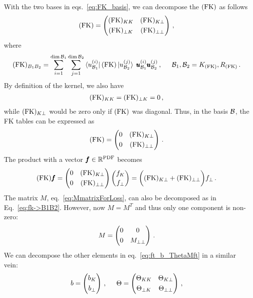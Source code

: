 With the two bases in eqs.~\eqref{eq:FK_basis}, we can decompose the $(\mathrm{FK})$ as follows
\begin{equation}
  (\mathrm{FK}) =
  \begin{pmatrix}
    (\mathrm{FK})_{KK}     & (\mathrm{FK})_{K\bot} \\[3pt]
    (\mathrm{FK})_{\bot K} & (\mathrm{FK})_{\bot\bot}
  \end{pmatrix} \,,
\end{equation}
where
\begin{align}
  (\mathrm{FK})_{B_1 B_2} = \sum_{i=1}^{\dim\mathcal{B}_1} \sum_{j=1}^{\dim\mathcal{B}_2}
  \bra{u_{\mathcal{B}_1}^{(i)}} (\mathrm{FK}) \ket{u_{\mathcal{B}_2}^{(j)}} \;
  \pmb{u}_{\mathcal{B}_1}^{(i)} \pmb{u}_{\mathcal{B}_2}^{(j)}\,,
  \hspace{5mm}
  \mathcal{B}_1, \mathcal{B}_2 = K_{(\mathrm{FK})}, R_{(\mathrm{FK})}\,.
  \label{eq:fk->B1B2}
\end{align}
By definition of the kernel, we also have
\begin{align}
  (\mathrm{FK})_{KK} = (\mathrm{FK})_{\bot K} = 0 \,,
\end{align}
while $(\mathrm{FK})_{K\bot}$ would be zero only if $(\mathrm{FK})$ was diagonal. Thus, in the basis
$\mathcal{B}$, the FK tables can be expressed as
\begin{align}
  (\mathrm{FK}) =
  \begin{pmatrix}
    0  & (\mathrm{FK})_{K\bot} \\[3pt]
    0 & (\mathrm{FK})_{\bot\bot}
  \end{pmatrix} \,.
\end{align}
The product with a vector $\pmb{f} \in \mathbb{R}^{\textrm{PDF}}$ becomes
\begin{equation}
  (\mathrm{FK}) \pmb{f} =
    \begin{pmatrix}
      0  & (\mathrm{FK})_{K\bot} \\[3pt]
      0  & (\mathrm{FK})_{\bot\bot}
    \end{pmatrix}
    \begin{pmatrix} 
      f_K \\[2pt]
      f_{\bot}
    \end{pmatrix}
    = \biggl((\mathrm{FK})_{K\bot} + (\mathrm{FK})_{\bot\bot}\biggr) f_{\bot} \,.
\end{equation}
The matrix $M$, eq.~\eqref{eq:MmatrixForLoss}, can also be decomposed as in Eq.~\eqref{eq:fk->B1B2}. However, now
$M=M^T$ and thus only one component is non-zero:
\begin{align}
  M =
  \begin{pmatrix}
    0 & 0 \\[3pt]
    0 & M_{\bot\bot}
  \end{pmatrix} \,.
  \label{eq:fk_projection_basis}
\end{align}
We can decompose the other elements in eq.~\eqref{eq:ft_b_ThetaMft} in a similar vein:
\begin{align}
  b = \begin{pmatrix} b_{K} \\[3pt] b_{\bot} \end{pmatrix} \,,
  \hspace{5mm}
  \Theta = \begin{pmatrix}
    \Theta_{KK} & \Theta_{K\bot} \\[3pt]
    \Theta_{\bot K} & \Theta_{\bot\bot}
  \end{pmatrix} \,,
\end{align}

